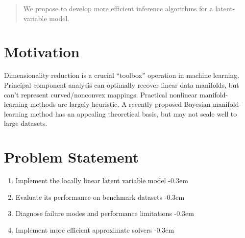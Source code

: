 \documentclass{article}
\begin{document}
 


\begin{abstract} 
We propose to develop more efficient inference algorithms for a latent-variable model.
\end{abstract} 

\section{Motivation}
Dimensionality reduction is a crucial ``toolbox'' operation in machine learning. Principal component analysis can optimally recover linear data manifolds, but can't represent curved/nonconvex mappings. Practical nonlinear manifold-learning methods are largely heuristic. A recently proposed Bayesian manifold-learning method has an appealing theoretical basis, but may not scale well to large datasets.

\section{Problem Statement}
\begin{enumerate}
\itemsep-0.3em
\item Implement the locally linear latent variable model
\itemsep-0.3em
\item Evaluate its performance on benchmark datasets
\itemsep-0.3em
\item Diagnose failure modes and performance limitations
\itemsep-0.3em
\item Implement more efficient approximate solvers
\itemsep-0.3em
\end{enumerate}
\end{document}
